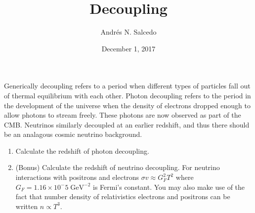 \documentclass[12pt, letterpaper]{article}
\title{Decoupling}
\author{Andr\'{e}s N. Salcedo}
\date{December 1, 2017}
\begin{document}
\maketitle

Generically decoupling refers to a period when different types of particles fall out of thermal equilibrium with each other. Photon decoupling refers to the period in the development of the universe when the density of electrons dropped enough to allow photons to stream freely. These photons are now observed as part of the CMB.  Neutrinos similarly decoupled at an earlier redshift, and thus there should be an analagous cosmic neutrino background.

\begin{enumerate}

\item Calculate the redshift of photon decoupling.

\item (Bonus) Calculate the redshift of neutrino decoupling. For neutrino interactions with positrons and electrons $\sigma v \approx G^2_F T^2$ where $G_F = 1.16 \times 10^-5 \; \mathrm{GeV}^{-2}$ is Fermi's constant. You may also make use of the fact that number density of relativistics electrons and positrons can be written $n \propto T^3$.
 

\end{enumerate}
\end{document}
